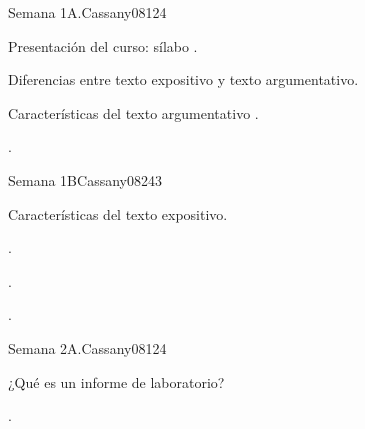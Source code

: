 \begin{syllabus}
\begin{outcomes}
   \item {}
   \item {}
   \item {}
\end{outcomes}

\begin{competences}
    \item {}
    \item {}
    \item {}
\end{competences}

\begin{unit}{Semana 1A.}{}{Cassany08}{12}{4}
   \begin{topics}
      \item Presentación del curso: sílabo .
      \item Diferencias entre texto expositivo y texto argumentativo. 
      \item Características del texto argumentativo .
   \end{topics}
   \begin{learningoutcomes}
      \item . 
   \end{learningoutcomes}
\end{unit}

\begin{unit}{Semana 1B}{}{Cassany08}{24}{3}
   \begin{topics}
      \item Características del texto expositivo.
   \end{topics}

   \begin{learningoutcomes}
      \item . 
      \item .
      \item . 
      \end{learningoutcomes}
\end{unit}

\begin{unit}{Semana 2A.}{}{Cassany08}{12}{4}
   \begin{topics}
      \item ¿Qué es un informe de laboratorio? 
   \end{topics}
   \begin{learningoutcomes}
      \item . 
   \end{learningoutcomes}
\end{unit}


\end{syllabus}
